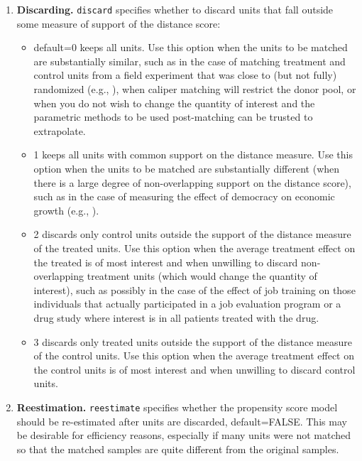 \documentclass[oneside,letterpaper,titlepage]{article}
\begin{document}
\begin{enumerate}
\item \textbf{Discarding.} \texttt{discard} specifies whether to
  discard units that fall outside some measure of support of the
  distance score:
  \begin{itemize}
  \item default=0 keeps all units.  Use this option when the units to
    be matched are substantially similar, such as in the case of
    matching treatment and control units from a field experiment that
    was close to (but not fully) randomized (e.g., \citealt{Imai03}),
    when caliper matching will restrict the donor pool, or when you do
    not wish to change the quantity of interest and the parametric
    methods to be used post-matching can be trusted to extrapolate.
  \item 1 keeps all units with common support on the distance measure.
    Use this option when the units to be matched are substantially
    different (when there is a large degree of non-overlapping support
    on the distance score), such as in the case of measuring the
    effect of democracy on economic growth (e.g.,
    \citealt{KinZen04}).
  \item 2 discards only control units outside the support of the
    distance measure of the treated units.  Use this option when the
    average treatment effect on the treated is of most interest and
    when unwilling to discard non-overlapping treatment units (which
    would change the quantity of interest), such as possibly in the
    case of the effect of job training on those individuals that
    actually participated in a job evaluation program or a drug study
    where interest is in all patients treated with the drug.
  \item 3 discards only treated units outside the support of the
    distance measure of the control units.  Use this option when the
    average treatment effect on the control units is of most interest
    and when unwilling to discard control units.
  \end{itemize}
  
\item \textbf{Reestimation.} \texttt{reestimate} specifies whether the
  propensity score model should be re-estimated after units are
  discarded, default=FALSE.  This may be desirable for efficiency
  reasons, especially if many units were not matched so that the
  matched samples are quite different from the original samples.


\end{enumerate}
\end{document}
